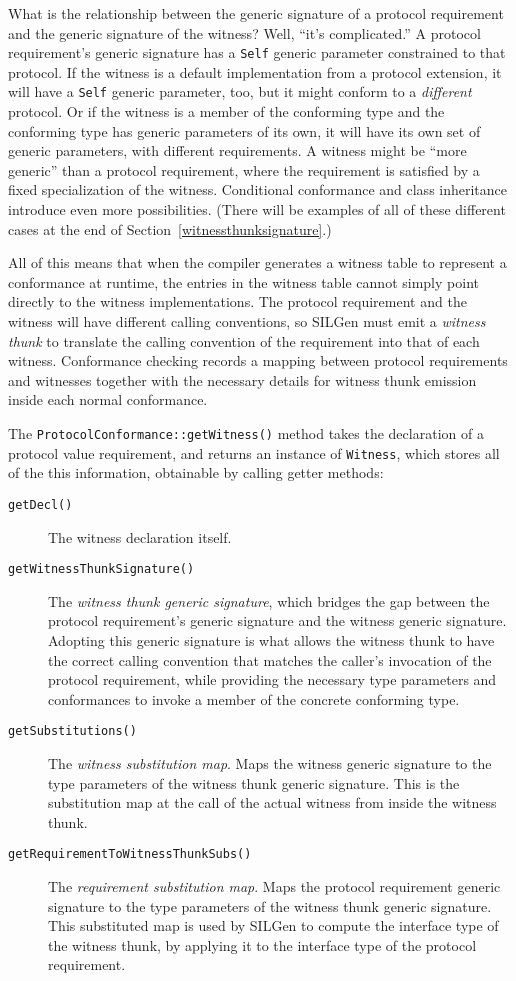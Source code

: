 \documentclass[a4paper,headsepline,bibliography=totoc,toc=flat,fleqn,twoside=semi]{scrbook}
\theoremstyle{definition}
\theoremstyle{definition}
\theoremstyle{definition}
\begin{document}
What is the relationship between the generic signature of a protocol requirement and the generic signature of the witness? Well, ``it's complicated.'' A protocol requirement's generic signature has a \texttt{Self} generic parameter constrained to that protocol. If the witness is a default implementation from a protocol extension, it will have a \texttt{Self} generic parameter, too, but it might conform to a \emph{different} protocol. Or if the witness is a member of the conforming type and the conforming type has generic parameters of its own, it will have its own set of generic parameters, with different requirements. A witness might be ``more generic'' than a protocol requirement, where the requirement is satisfied by a fixed specialization of the witness. Conditional conformance and class inheritance introduce even more possibilities. (There will be examples of all of these different cases at the end of Section~\ref{witnessthunksignature}.)

All of this means that when the compiler generates a witness table to represent a conformance at runtime, the entries in the witness table cannot simply point directly to the witness implementations. The protocol requirement and the witness will have different calling conventions, so SILGen must emit a \emph{witness thunk} to translate the calling convention of the requirement into that of each witness. Conformance checking records a mapping between protocol requirements and witnesses together with the necessary details for witness thunk emission inside each normal conformance.

The \texttt{ProtocolConformance::getWitness()} method takes the declaration of a protocol value requirement, and returns an instance of \texttt{Witness}, which stores all of the this information, obtainable by calling getter methods:
\begin{description}
\item[\texttt{getDecl()}] The witness declaration itself.
\item[\texttt{getWitnessThunkSignature()}] The \emph{witness thunk generic signature}, which bridges the gap between the protocol requirement's generic signature and the witness generic signature. Adopting this generic signature is what allows the witness thunk to have the correct calling convention that matches the caller's invocation of the protocol requirement, while providing the necessary type parameters and conformances to invoke a member of the concrete conforming type.
\item[\texttt{getSubstitutions()}] The \emph{witness substitution map}. Maps the witness generic signature to the type parameters of the witness thunk generic signature. This is the substitution map at the call of the actual witness from inside the witness thunk.
\item[\texttt{getRequirementToWitnessThunkSubs()}] The \emph{requirement substitution map}.  Maps the protocol requirement generic signature to the type parameters of the witness thunk generic signature. This substituted map is used by SILGen to compute the interface type of the witness thunk, by applying it to the interface type of the protocol requirement.
\end{description}
\end{document}
